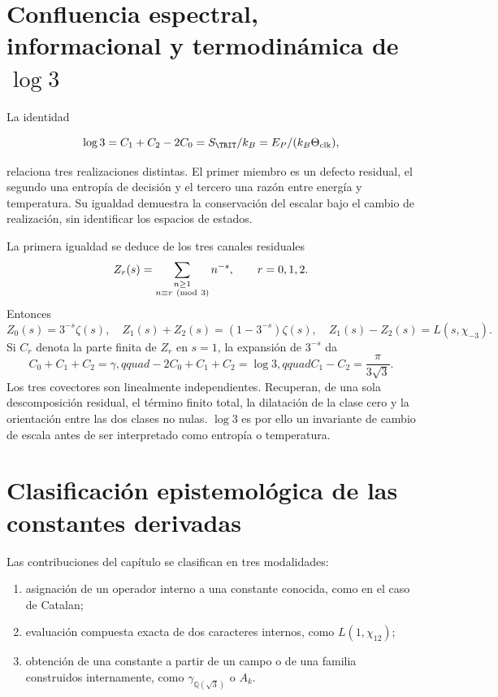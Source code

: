 \section{Confluencia espectral, informacional y termodin\'amica de \(\log3\)}

La identidad

\[
\log3=C_1+C_2-2C_0
=S_{\TRIT}/k_B
=E_P/(k_B\Theta_{\rm clk}),
\]

relaciona tres realizaciones distintas. El primer miembro es un defecto
residual, el segundo una entrop\'ia de decisi\'on y el tercero una raz\'on
entre energ\'ia y temperatura. Su igualdad demuestra la conservaci\'on del
escalar bajo el cambio de realizaci\'on, sin identificar los espacios de
estados.

La primera igualdad se deduce de los tres canales
residuales
\[
Z_r(s)=\sum_{\substack{n\ge1\\n\equiv r\ ({\rm mod}\ 3)}}n^{-s},
\qquad r=0,1,2.
\]
Entonces
\[
Z_0(s)=3^{-s}\zeta(s),\quad
Z_1(s)+Z_2(s)=(1-3^{-s})\zeta(s),\quad
Z_1(s)-Z_2(s)=L(s,\chi_{-3}).
\]
Si \(C_r\) denota la parte finita de \(Z_r\) en \(s=1\), la expansi\'on
de \(3^{-s}\) da
\begin{equation}
C_0+C_1+C_2=\gamma,qquad
-2C_0+C_1+C_2=\log3,qquad
C_1-C_2=\frac{\pi}{3\sqrt3}.
\label{eq:residual-three-covectors}
\end{equation}
Los tres covectores son linealmente independientes. Recuperan, de una sola
descomposici\'on residual, el t\'ermino finito total, la dilataci\'on de la
clase cero y la orientaci\'on entre las dos clases no nulas. \(\log3\) es
por ello un invariante de cambio de escala antes de ser interpretado como
entrop\'ia o temperatura.

\section{Clasificaci\'on epistemol\'ogica de las constantes derivadas}

Las contribuciones del cap\'itulo se clasifican en tres modalidades:

\begin{enumerate}
\item asignaci\'on de un operador interno a una constante conocida, como en
el caso de Catalan;
\item evaluaci\'on compuesta exacta de dos caracteres internos, como
\(L(1,\chi_{12})\);
\item obtenci\'on de una constante a partir de un campo o de una familia
construidos internamente, como \(\gamma_{\mathbb Q(\sqrt3)}\) o \(A_k\).
\end{enumerate}

